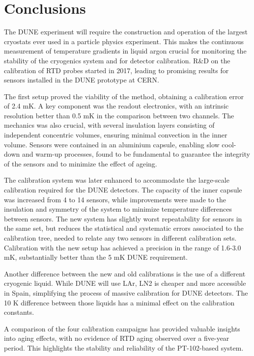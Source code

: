 \section{Conclusions}
\label{conclusions}

\noindent The DUNE experiment will require the construction and operation of the largest cryostats ever used in a particle physics experiment. This makes the continuous measurement of temperature gradients in liquid argon crucial for monitoring the stability of the cryogenics system and for detector calibration. R\&D on the calibration of RTD probes started in 2017, leading to promising results for sensors installed in the DUNE prototype at CERN.

The first setup proved the viability of the method, obtaining a calibration error of 2.4 mK. A key component was the readout electronics, with an intrinsic resolution better than 0.5 mK in the comparison between two channels. The mechanics was also crucial, with several insulation layers consisting of independent concentric volumes, ensuring minimal convection in the inner volume. Sensors were contained in an aluminium capsule, enabling slow cool-down and warm-up processes, found to be fundamental to guarantee the integrity of the sensors and to minimize the effect of ageing.

The calibration system was later enhanced to accommodate the large-scale calibration required for the DUNE detectors. The capacity of the inner capsule was increased from 4 to 14 sensors, while improvements were made to the insulation and symmetry of the system to minimize temperature differences between sensors. The new system has slightly worst repeatability for sensors in the same set, but reduces the statistical and systematic errors associated to the calibration tree, needed to relate any two sensors in different calibration sets. Calibration with the new setup has achieved a precision in the range of 1.6-3.0 mK, substantially better than the 5 mK DUNE requirement.

Another difference between the new and old calibrations is the use of a different cryogenic liquid. While DUNE will use LAr, LN2 is cheaper and more accessible in Spain, simplifying the process of massive calibration for DUNE detectors. The 10 K difference between those liquids has a minimal effect on the calibration constants.

A comparison of the four calibration campaigns has provided valuable insights into aging effects, with no evidence of RTD aging observed over a five-year period. This highlights the stability and reliability of the PT-102-based system.
